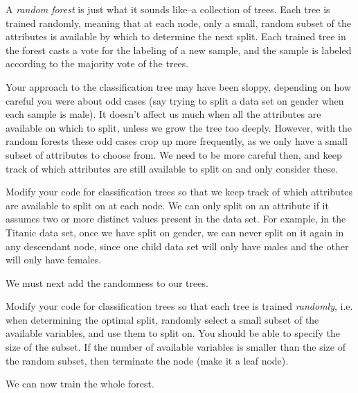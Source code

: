 
A \emph{random forest} is just what it sounds like--a collection of trees. Each tree is trained randomly, meaning that at each node, only a small, random subset of the attributes is available by which to determine the next split. Each trained tree in the forest casts a vote for the labeling of a new sample, and the sample is labeled according to the majority vote of the trees.

Your approach to the classification tree may have been sloppy, depending on how careful you were about odd cases (say trying to split a data set on gender when each sample is male). It doesn't affect us much when all the attributes are available on which to split, unless we grow the tree too deeply. However, with the random forests these odd cases crop up more frequently, as we only have a small subset of attributes to choose from. We need to be more careful then, and keep track of which attributes are still available to split on and only consider these.

\begin{problem}
Modify your code for classification trees so that we keep track of which attributes are available to split on at each node. We can only split on an attribute if it assumes two or more distinct values present in the data set. For example, in the Titanic data set, once we have split on gender, we can never split on it again in any descendant node, since one child data set will only have males and the other will only have females.
\end{problem}

We must next add the randomness to our trees.

\begin{problem}
Modify your code for classification trees so that each tree is trained \emph{randomly}, i.e. when determining the optimal split, randomly select a small subset of the available variables, and use them to split on. You should be able to specify the size of the subset. If the number of available variables is smaller than the size of the random subset, then terminate the node (make it a leaf node).
\end{problem}

We can now train the whole forest.

